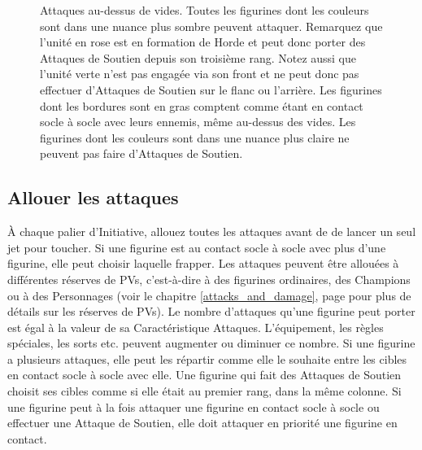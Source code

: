 \begin{figure}[!htbp]
\begin{minipage}{0.44\textwidth}
\def\svgwidth{\textwidth}

\end{minipage}\hfill\begin{minipage}{0.55\textwidth}
\caption{\hypertarget{whocanstrikefigure}{Attaques au-dessus de vides.}\vspace*{10pt}\newline
Toutes les figurines dont les couleurs sont dans une nuance plus sombre peuvent attaquer. Remarquez que l'unité en rose est en formation de Horde et peut donc porter des Attaques de Soutien depuis son troisième rang. Notez aussi que l'unité verte n'est pas engagée via son front et ne peut donc pas effectuer d'Attaques de Soutien sur le flanc ou l'arrière.\vspace*{10pt}\newline
Les figurines dont les bordures sont en gras comptent comme étant en contact socle à socle avec leurs ennemis, même au-dessus des vides. Les figurines dont les couleurs sont dans une nuance plus claire ne peuvent pas faire d'Attaques de Soutien.}
\label{figure/empty_gaps}
\end{minipage}
\end{figure}

\subsection{Allouer les attaques}

À chaque palier d'Initiative, allouez toutes les attaques avant de de lancer un seul jet pour toucher. Si une figurine est au contact socle à socle avec plus d'une figurine, elle peut choisir laquelle frapper. Les attaques peuvent être allouées à différentes réserves de PVs, c'est-à-dire à des figurines ordinaires, des Champions ou à des Personnages (voir le chapitre \ref{attacks_and_damage}, page \pageref{attacks_and_damage} pour plus de détails sur les réserves de PVs). Le nombre d'attaques qu'une figurine peut porter est égal à la valeur de sa Caractéristique Attaques. L'équipement, les règles spéciales, les sorts etc. peuvent augmenter ou diminuer ce nombre. Si une figurine a plusieurs attaques, elle peut les répartir comme elle le souhaite entre les cibles en contact socle à socle avec elle. Une figurine qui fait des Attaques de Soutien choisit ses cibles comme si elle était au premier rang, dans la même colonne. Si une figurine peut à la fois attaquer une figurine en contact socle à socle ou effectuer une Attaque de Soutien, elle doit attaquer en priorité une figurine en contact.

